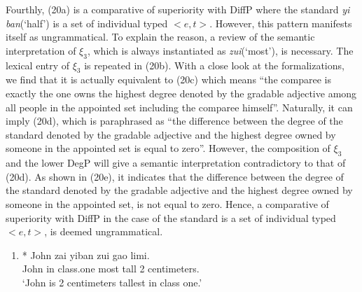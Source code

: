 \documentclass{ctexart}
\begin{document}
Fourthly, (20a) is a comparative of superiority with DiffP where the standard \textit{yi ban}(`half') is a set of individual typed $<e,t>$. However, this pattern manifests itself as ungrammatical. To explain the reason, a review of the semantic interpretation of $\xi_3$, which is always instantiated as \textit{zui}(`most'), is necessary. The lexical entry of $\xi_3$ is repeated in (20b). With a close look at the formalizations, we find that it is actually equivalent to (20c) which means ``the comparee is exactly the one owns the highest degree denoted by the gradable adjective among all people in the appointed set including the comparee himself''. Naturally, it can imply (20d), which is paraphrased as ``the difference between the degree  of the standard denoted by the gradable adjective and the highest degree owned by someone in the appointed set is equal to zero''. However, the composition of $\xi_3$ and the lower DegP will give a semantic interpretation contradictory to that of (20d). As shown in (20e), it indicates that the difference between the degree of the standard denoted by the gradable adjective and the highest degree owned by someone in the appointed set, is not equal to zero. Hence, a comparative of superiority with DiffP in the case of the standard is a set of individual typed $<e,t>$, is deemed ungrammatical.

\begin{enumerate}
    \item \label{maomao20_a}
    * John zai \enspace yiban \enspace \enspace zui \enspace gao \enspace \enspace {} limi. \\
    \hspace*{0.5em} John in \enspace class.one most tall 2 centimeters. \\
    \hspace*{0.5em} `John is 2 centimeters tallest in class one.'
\end{enumerate}
\end{document}

